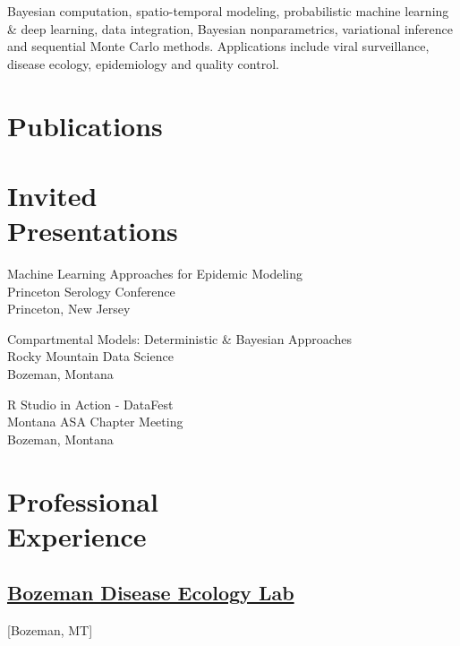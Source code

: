 \documentclass{wm_cv}
\begin{document}
Bayesian computation, spatio-temporal modeling, probabilistic machine learning \& deep learning, data integration, Bayesian nonparametrics, variational inference and sequential Monte Carlo methods. 
Applications include viral surveillance, disease ecology, epidemiology and quality control. 

\section{Publications}%


\section{Invited \\ Presentations}

Machine Learning Approaches for Epidemic Modeling \\
    \indent \quad Princeton Serology Conference \hfill {} \\
   \indent \quad Princeton, New Jersey

Compartmental Models: Deterministic \& Bayesian Approaches \\ 
    \indent \quad Rocky Mountain Data Science \hfill {} \\
   \indent \quad Bozeman, Montana
   
R Studio in Action - DataFest\\ 
    \indent \quad Montana ASA Chapter Meeting \hfill {} \\
   \indent \quad Bozeman, Montana

\section{Professional \\ Experience}
\subsection{\href{http://bzndiseaselab.org/}{Bozeman Disease Ecology Lab}}[Bozeman, MT]
\begin{positions}
\end{positions}
\end{document}
